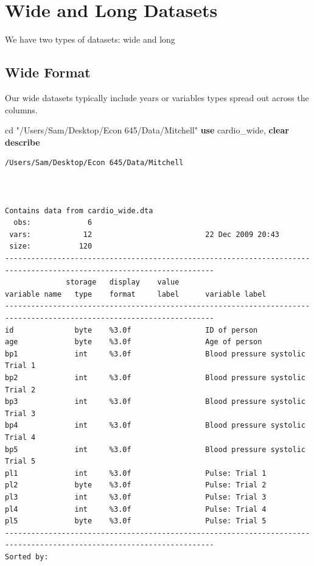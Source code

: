 \documentclass[
]{book}
\newenvironment{Shaded}{\begin{snugshade}}{\end{snugshade}}
\newcommand{\KeywordTok}[1]{\textcolor[rgb]{0.13,0.29,0.53}{\textbf{#1}}}
\newcommand{\NormalTok}[1]{#1}
\newcommand{\StringTok}[1]{\textcolor[rgb]{0.31,0.60,0.02}{#1}}
\begin{document}
\section{Wide and Long Datasets}\label{wide-and-long-datasets}

We have two types of datasets: wide and long

\subsection*{Wide Format}\label{wide-format}

Our wide datasets typically include years or variables types spread out across
the columns.

\begin{Shaded}
\begin{Highlighting}[]
\NormalTok{cd }\StringTok{"/Users/Sam/Desktop/Econ 645/Data/Mitchell"}
\KeywordTok{use}\NormalTok{ cardio\_wide, }\KeywordTok{clear}
\KeywordTok{describe}
\end{Highlighting}
\end{Shaded}

\begin{verbatim}
/Users/Sam/Desktop/Econ 645/Data/Mitchell



Contains data from cardio_wide.dta
  obs:             6                          
 vars:            12                          22 Dec 2009 20:43
 size:           120                          
----------------------------------------------------------------------------------------------------------------------
              storage   display    value
variable name   type    format     label      variable label
----------------------------------------------------------------------------------------------------------------------
id              byte    %3.0f                 ID of person
age             byte    %3.0f                 Age of person
bp1             int     %3.0f                 Blood pressure systolic Trial 1
bp2             int     %3.0f                 Blood pressure systolic Trial 2
bp3             int     %3.0f                 Blood pressure systolic Trial 3
bp4             int     %3.0f                 Blood pressure systolic Trial 4
bp5             int     %3.0f                 Blood pressure systolic Trial 5
pl1             int     %3.0f                 Pulse: Trial 1
pl2             byte    %3.0f                 Pulse: Trial 2
pl3             int     %3.0f                 Pulse: Trial 3
pl4             int     %3.0f                 Pulse: Trial 4
pl5             byte    %3.0f                 Pulse: Trial 5
----------------------------------------------------------------------------------------------------------------------
Sorted by: 
\end{verbatim}
\end{document}
